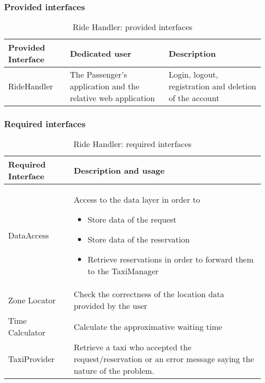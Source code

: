 \subsubsection{Provided interfaces}
\begin{table}[H]
\begin{longtable}{| p{} | p{} | p{} |}
\hline
 \textbf{Provided Interface} & \textbf{Dedicated user} & \textbf{Description} \\ \hline
RideHandler & The Passenger's application and the relative web application & Login, logout, registration and deletion of the account \\ \hline
\end{longtable}
\caption{Ride Handler: provided interfaces}
\label{tab:rideHandler:providedInterfaces}
\end{table}
\subsubsection{Required interfaces}
\begin{table}[H]
\begin{longtable}{| l | p{} |}
\hline
 \textbf{Required Interface} & \textbf{Description and usage} \\ \hline
DataAccess & Access to the data layer in order to 
			\begin{itemize}
				\item Store data of the request
				\item Store data of the reservation
				\item Retrieve reservations in order to forward them to the TaxiManager
			\end{itemize} \\ \hline
Zone Locator & Check the correctness of the location data provided by the user \\ \hline
Time Calculator & Calculate the approximative waiting time \\ \hline
TaxiProvider & Retrieve a taxi who accepted the request/reservation or an error message saying the nature of the problem. \\ \hline
\end{longtable}
\caption{Ride Handler: required interfaces}
\label{tab:rideHandler:requiredInterfaces}
\end{table}
